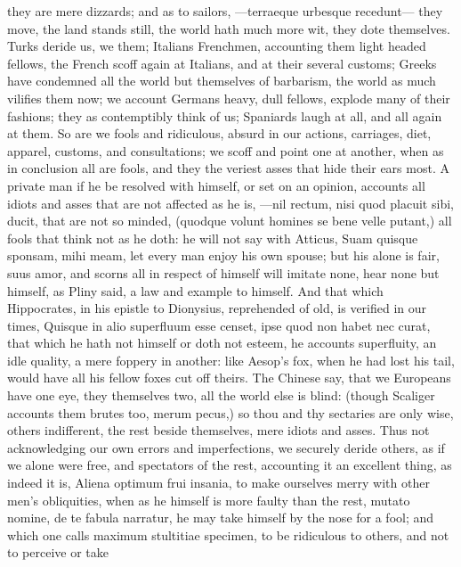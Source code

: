 {they are mere dizzards; and as to sailors, ---terraeque urbesque
recedunt--- they move, the land stands still, the world hath much more
wit, they dote themselves. Turks deride us, we them; Italians
Frenchmen, accounting them light headed fellows, the French scoff again
at Italians, and at their several customs; Greeks have condemned all
the world but themselves of barbarism, the world as much vilifies them
now; we account Germans heavy, dull fellows, explode many of their
fashions; they as contemptibly think of us; Spaniards laugh at all, and
all again at them. So are we fools and ridiculous, absurd in our
actions, carriages, diet, apparel, customs, and consultations; we 
scoff and point one at another, when as in conclusion all are fools,
 and they the veriest asses that hide their ears most. A private
man if he be resolved with himself, or set on an opinion, accounts all
idiots and asses that are not affected as he is, ---nil rectum,
nisi quod placuit sibi, ducit, that are not so minded, (quodque
volunt homines se bene velle putant,) all fools that think not as he
doth: he will not say with Atticus, Suam quisque sponsam, mihi meam,
let every man enjoy his own spouse; but his alone is fair, suus amor,
\etc{} and scorns all in respect of himself will imitate none, hear
none but himself, as Pliny said, a law and example to himself. And
that which Hippocrates, in his epistle to Dionysius, reprehended of
old, is verified in our times, Quisque in alio superfluum esse censet,
ipse quod non habet nec curat, that which he hath not himself or doth
not esteem, he accounts superfluity, an idle quality, a mere foppery in
another: like Aesop's fox, when he had lost his tail, would have all
his fellow foxes cut off theirs. The Chinese say, that we Europeans
have one eye, they themselves two, all the world else is blind: (though
Scaliger accounts them brutes too, merum pecus,) so thou and thy
sectaries are only wise, others indifferent, the rest beside
themselves, mere idiots and asses. Thus not acknowledging our own
errors and imperfections, we securely deride others, as if we alone
were free, and spectators of the rest, accounting it an excellent
thing, as indeed it is, Aliena optimum frui insania, to make ourselves
merry with other men's obliquities, when as he himself is more faulty
than the rest, mutato nomine, de te fabula narratur, he may take
himself by the nose for a fool; and which one calls maximum stultitiae
specimen, to be ridiculous to others, and not to perceive or take
}
